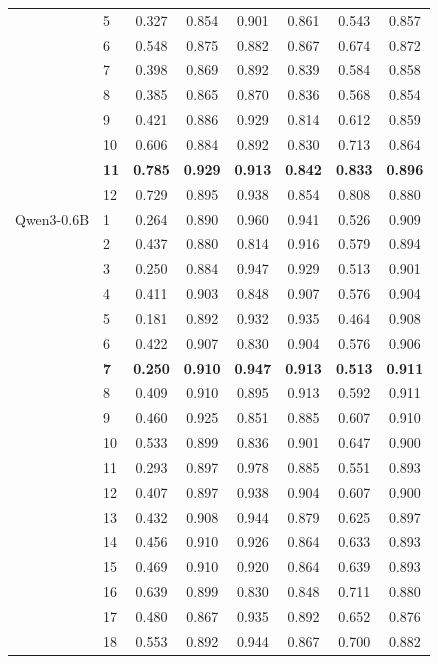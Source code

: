 \begin{longtable}{llcccccc}
 & 5 & 0.327 & 0.854 & 0.901 & 0.861 & 0.543 & 0.857 \\
 & 6 & 0.548 & 0.875 & 0.882 & 0.867 & 0.674 & 0.872 \\
 & 7 & 0.398 & 0.869 & 0.892 & 0.839 & 0.584 & 0.858 \\
 & 8 & 0.385 & 0.865 & 0.870 & 0.836 & 0.568 & 0.854 \\
 & 9 & 0.421 & 0.886 & 0.929 & 0.814 & 0.612 & 0.859 \\
 & 10 & 0.606 & 0.884 & 0.892 & 0.830 & 0.713 & 0.864 \\
 & \textbf{11} & \textbf{0.785} & \textbf{0.929} & \textbf{0.913} & \textbf{0.842} & \textbf{0.833} & \textbf{0.896} \\
 & 12 & 0.729 & 0.895 & 0.938 & 0.854 & 0.808 & 0.880 \\
\midrule
Qwen3-0.6B & 1 & 0.264 & 0.890 & 0.960 & 0.941 & 0.526 & 0.909 \\
 & 2 & 0.437 & 0.880 & 0.814 & 0.916 & 0.579 & 0.894 \\
 & 3 & 0.250 & 0.884 & 0.947 & 0.929 & 0.513 & 0.901 \\
 & 4 & 0.411 & 0.903 & 0.848 & 0.907 & 0.576 & 0.904 \\
 & 5 & 0.181 & 0.892 & 0.932 & 0.935 & 0.464 & 0.908 \\
 & 6 & 0.422 & 0.907 & 0.830 & 0.904 & 0.576 & 0.906 \\
 & \textbf{7} & \textbf{0.250} & \textbf{0.910} & \textbf{0.947} & \textbf{0.913} & \textbf{0.513} & \textbf{0.911} \\
 & 8 & 0.409 & 0.910 & 0.895 & 0.913 & 0.592 & 0.911 \\
 & 9 & 0.460 & 0.925 & 0.851 & 0.885 & 0.607 & 0.910 \\
 & 10 & 0.533 & 0.899 & 0.836 & 0.901 & 0.647 & 0.900 \\
 & 11 & 0.293 & 0.897 & 0.978 & 0.885 & 0.551 & 0.893 \\
 & 12 & 0.407 & 0.897 & 0.938 & 0.904 & 0.607 & 0.900 \\
 & 13 & 0.432 & 0.908 & 0.944 & 0.879 & 0.625 & 0.897 \\
 & 14 & 0.456 & 0.910 & 0.926 & 0.864 & 0.633 & 0.893 \\
 & 15 & 0.469 & 0.910 & 0.920 & 0.864 & 0.639 & 0.893 \\
 & 16 & 0.639 & 0.899 & 0.830 & 0.848 & 0.711 & 0.880 \\
 & 17 & 0.480 & 0.867 & 0.935 & 0.892 & 0.652 & 0.876 \\
 & 18 & 0.553 & 0.892 & 0.944 & 0.867 & 0.700 & 0.882 \\

\end{longtable}
